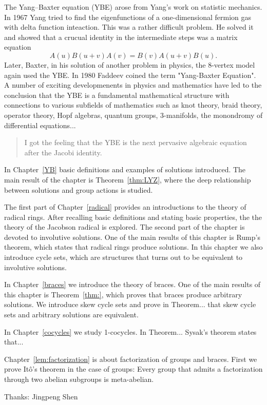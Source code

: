 
The Yang--Baxter equation (YBE) arose from Yang's work on statistic mechanics. In 1967 Yang tried to find the eigenfunctions of a one-dimensional fermion gas with delta function inteaction. This was
a rather difficult problem. He solved it and showed that a crucual identity in the intermediate steps was a matrix equation
\[
A(u)B(u+v)A(v)=B(v)A(u+v)B(u).
\]
Later, Baxter, in his solution of another problem in physics, the 8-vertex model again used the YBE. 
In 1980 Faddeev coined the term "Yang-Baxter Equation". A number of exciting developmenents in 
physics and mathematics have led to the conclusion that the YBE is a fundamental mathematical structure with connections to various subfields of mathematics such as 
knot theory, braid theory, operator theory, Hopf algebras, quantum groups, 3-manifolds, the monondromy of differential equations...

\begin{quote}
    I got the feeling that the YBE is the next pervasive algebraic equation after the Jacobi identity.
\end{quote}


\medskip
In Chapter~\ref{YB} basic definitions and examples of solutions introduced. 
The main result of the chapter is Theorem~\ref{thm:LYZ}, where the deep relationship between
solutions and group actions is studied. 

The first part of Chapter~\ref{radical} provides an introductions to the theory of radical rings.
After recalling basic definitions and stating basic properties, the the theory of the Jacobson
radical is explored. The second part of the chapter is devoted to involutive solutions. One of the
main results of this chapter is Rump's theorem, which states that radical rings produce solutions. In this
chapter we also introduce cycle sets, which are structures that turns out to be equivalent
to involutive solutions. 

In Chapter~\ref{braces} we introduce the theory of braces. One of the main results of this 
chapter is Theorem~\ref{thm:}, which proves that braces produce arbitrary solutions. We introduce
skew cycle sets and prove in Theorem... that skew cycle sets and arbitrary solutions are equivalent. 

In Chapter~\ref{cocycles} we study 1-cocycles. 
In Theorem... 
Sysak's theorem states that...

Chapter~\ref{lem:factorization} is about factorization of groups and braces. First
we prove It\^o's theorem in the case of groups: Every group that admits a factorization through two 
abelian subgroups is meta-abelian. 

Thanks: Jingpeng Shen

